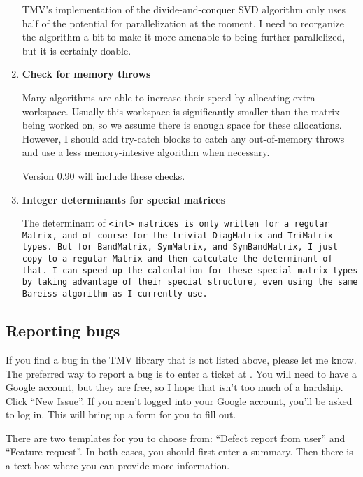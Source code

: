 \begin{enumerate}
TMV's implementation of the divide-and-conquer SVD algorithm only uses half of the potential for parallelization at the moment.  I need to reorganize the algorithm a bit to make it more amenable to being further parallelized, but it is certainly doable.

\item
\textbf{Check for memory throws}

Many algorithms are able to increase their speed by allocating extra
workspace.  Usually this workspace is significantly smaller than the
matrix being worked on, so we assume there is enough space for 
these allocations.  However, I should add try-catch blocks to catch 
any out-of-memory throws and use a less memory-intesive algorithm
when necessary.

Version 0.90 will include these checks.

\item
\textbf{Integer determinants for special matrices}

The determinant of \tt{<int>} matrices is only written for a regular \tt{Matrix},
and of course for the trivial \tt{DiagMatrix} and \tt{TriMatrix} types.  But
for \tt{BandMatrix}, \tt{SymMatrix}, and \tt{SymBandMatrix}, I just copy to a regular
\tt{Matrix} and then calculate the determinant of that.  I can speed up the 
calculation for these special matrix types by taking advantage of their special
structure, even using the same Bareiss algorithm as I currently use.

\end{enumerate}

\subsection{Reporting bugs}

If you find a bug in the TMV library that is not listed above, please let me know.  The preferred way to report a bug is to enter a ticket at \myissues.  You will need to have a Google account, but they are free, so I hope that isn't too much of a hardship.  Click ``New Issue''.  If you aren't logged into your Google account, you'll be asked to log in.  This will bring up a form for you to fill out.  

There are two templates for you to choose from: ``Defect report from user'' and ``Feature request''.  In both cases, you should first enter a summary.  Then there is a text box where you can provide more information.

